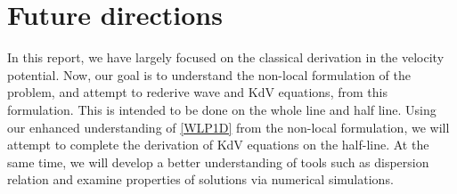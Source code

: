 \documentclass[10pt,reqno,oneside,a4paper]{article}
\begin{document}
\section{Future directions}
In this report, we have largely focused on the classical derivation in the velocity potential. Now, our goal is to understand the non-local formulation of the problem, and attempt to rederive wave and KdV equations, from this formulation. This is intended to be done on the whole line and half line. Using our enhanced understanding of \eqref{WLP1D} from the non-local formulation, we will attempt to complete the derivation of KdV equations on the half-line. At the same time, we will develop a better understanding of tools such as dispersion relation and examine properties of solutions via numerical simulations. 


{\small}
\end{document}
